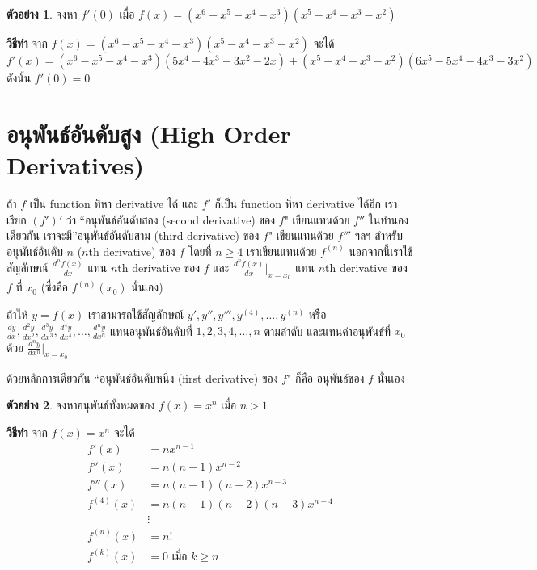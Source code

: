 \documentclass[
]{book}
\theoremstyle{definition}
\theoremstyle{definition}
\newtheorem{example}{ตัวอย่าง}[chapter]
\theoremstyle{definition}
\theoremstyle{definition}
\theoremstyle{remark}
\begin{document}
\begin{example}
จงหา \(f'(0)\) เมื่อ \(f(x) = (x^6 - x^5-x^4-x^3)(x^5-x^4-x^3-x^2)\)
\end{example}

\textbf{วิธีทำ} จาก \(f(x) = (x^6 - x^5-x^4-x^3)(x^5-x^4-x^3-x^2)\) จะได้
\[f'(x) = (x^6 - x^5-x^4-x^3)(5x^4-4x^3-3x^2-2x) +
    (x^5-x^4-x^3-x^2)(6x^5 - 5x^4-4x^3-3x^2)\] ดังนั้น \(f'(0) = 0\)

\section{อนุพันธ์อันดับสูง (High Order Derivatives)}\label{uxe2duxe19uxe1euxe19uxe18uxe2duxe19uxe14uxe1auxe2auxe07-high-order-derivatives}

ถ้า \(f\) เป็น function ที่หา derivative ได้ และ \(f'\) ก็เป็น function ที่หา
derivative ได้อีก เราเรียก \((f')'\) ว่า ``อนุพันธ์อันดับสอง (second derivative) ของ
\(f\)" เขียนแทนด้วย \(f''\) ในทำนองเดียวกัน เราจะมี''อนุพันธ์อันดับสาม (third
derivative) ของ \(f\)" เขียนแทนด้วย \(f'''\) ฯลฯ สำหรับอนุพันธ์อันดับ \(n\) (\(n\)th
derivative) ของ \(f\) โดยที่ \(n \ge 4\) เราเขียนแทนด้วย \(f^{(n)}\)
นอกจากนี้เราใช้สัญลักษณ์ \(\frac{d^nf(x)}{dx}\) แทน \(n\)th derivative ของ \(f\) และ
\(\frac{d^nf(x)}{dx}|_{x=x_0}\) แทน \(n\)th derivative ของ \(f\) ที่ \(x_0\) (ซึ่งคือ
\(f^{(n)}(x_0)\) นั่นเอง)

ถ้าให้ \(y= f(x)\) เราสามารถใช้สัญลักษณ์
\(y', y'', y''', y^{(4)}, \ldots, y^{(n)}\) หรือ
\(\frac{dy}{dx}, \frac{d^2y}{dx^2}, \frac{d^3y}{dx^3}, \frac{d^4y}{dx^4}, \ldots,
\frac{d^ny}{dx^n}\) แทนอนุพันธ์อันดับที่ \(1,2,3,4,\ldots,n\) ตามลำดับ
และแทนค่าอนุพันธ์ที่ \(x_0\) ด้วย \(\frac{d^ny}{dx^n}|_{x=x_0}\)

ด้วยหลักการเดียวกัน ``อนุพันธ์อันดับหนึ่ง (first derivative) ของ \(f\)" ก็คือ อนุพันธ์ของ
\(f\) นั่นเอง

\begin{example}
จงหาอนุพันธ์ทั้งหมดของ \(f(x) = x^n\) เมื่อ \(n > 1\)
\end{example}

\textbf{วิธีทำ} จาก \(f(x) = x^n\) จะได้ \begin{equation}   \begin{aligned}
        f'(x) &= n x^{n-1} \\
        f''(x) &= n(n-1) x^{n-2} \\
        f'''(x) &= n(n-1)(n-2) x^{n-3} \\
        f^{(4)}(x) &= n(n-1)(n-2)(n-3) x^{n-4} \\
          &\vdots \\
        f^{(n)}(x) &= n! \\
        f^{(k)}(x) &= 0 \text{ เมื่อ } k \ge n
  \end{aligned} \end{equation}
\end{document}
